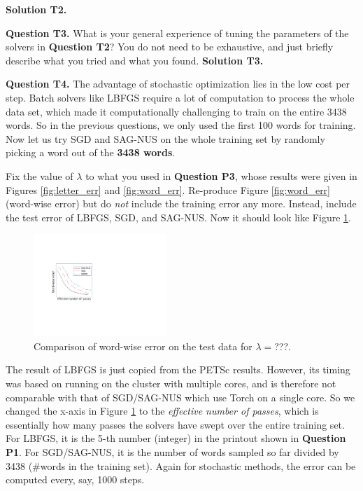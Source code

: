 \documentclass[11pt]{report}
\begin{document}
{\bf Solution T2.}

{\bf Question T3.}
What is your general experience of tuning the parameters of the solvers in {\bf Question T2}?
You do not need to be exhaustive, and just briefly describe what you tried and what you found.
{\bf Solution T3.}

{\bf Question T4.}
The advantage of stochastic optimization lies in the low cost per step.
Batch solvers like LBFGS require a lot of computation to process the whole data set,
which made it computationally challenging to train on the entire 3438 words.
So in the previous questions, we only used the first 100 words for training.
Now let us try SGD and SAG-NUS on the whole training set by randomly picking a word out of the {\bf 3438 words}.

Fix the value of $\lambda$ to what you used in {\bf Question P3},
whose results were given in Figures \ref{fig:letter_err} and \ref{fig:word_err}.
Re-produce Figure \ref{fig:word_err} (word-wise error) but do \emph{not} include the training error any more.
Instead, include the test error of LBFGS, SGD, and SAG-NUS.
Now it should look like Figure \ref{fig:compare_word_err}.

\begin{figure}[t] 
\centering
\includegraphics[width=5cm]{error_Torch}
\caption{Comparison of word-wise error on the test data for $\lambda=$???.}
\label{fig:compare_word_err}
\end{figure}

The result of LBFGS is just copied from the PETSc results.
However, its timing was based on running on the cluster with multiple cores,
and is therefore not comparable with that of SGD/SAG-NUS which use Torch on a single core.
So we changed the x-axis in Figure \ref{fig:compare_word_err} to the \emph{effective number of passes}, which is essentially how many passes the solvers have swept over the entire training set.
For LBFGS, it is the 5-th number (integer) in the printout shown in {\bf Question P1}.
For SGD/SAG-NUS, it is the number of words sampled so far divided by 3438
(\#words in the training set).
Again for stochastic methods, the error can be computed every, say, 1000 steps.
\end{document}
